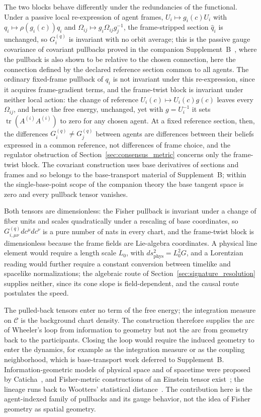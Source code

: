 \documentclass[11pt]{article}
\begin{document}
The two blocks behave differently under the redundancies of the functional. Under a passive local re-expression of agent frames, $U_i \mapsto g_i(c)U_i$ with $q_i \mapsto \rho(g_i(c))q_i$ and $\Omega_{ij} \mapsto g_i\Omega_{ij}g_j^{-1}$, the frame-stripped section $\hat{q}_i$ is unchanged, so $G^{(q)}_i$ is invariant with no orbit average; this is the passive gauge covariance of covariant pullbacks proved in the companion Supplement~B~\cite[Ch.~B2]{DennisGaugeVFESuppB2026}, where the pullback is also shown to be relative to the chosen connection, here the connection defined by the declared reference section common to all agents. The ordinary fixed-frame pullback of $q_i$ is not invariant under this re-expression, since it acquires frame-gradient terms, and the frame-twist block is invariant under neither local action: the change of reference $U_i(c) \mapsto U_i(c)g(c)$ leaves every $\Omega_{ij}$, and hence the free energy, unchanged, yet with $g = U_i^{-1}$ it sets $\operatorname{tr}(A^{(i)}A^{(i)})$ to zero for any chosen agent. At a fixed reference section, then, the differences $G^{(q)}_i \neq G^{(q)}_j$ between agents are differences between their beliefs expressed in a common reference, not differences of frame choice, and the regulator obstruction of Section~\ref{sec:consensus_metric} concerns only the frame-twist block. The covariant construction uses base derivatives of sections and frames and so belongs to the base-transport material of Supplement~B; within the single-base-point scope of the companion theory the base tangent space is zero and every pullback tensor vanishes.

Both tensors are dimensionless: the Fisher pullback is invariant under a change of fiber units and scales quadratically under a rescaling of base coordinates, so $G^{(q)}_{i,\mu\nu}dc^\mu dc^\nu$ is a pure number of nats in every chart, and the frame-twist block is dimensionless because the frame fields are Lie-algebra coordinates. A physical line element would require a length scale $L_0$, with $ds^2_{\text{phys}} = L_0^2 G$, and a Lorentzian reading would further require a constant conversion between timelike and spacelike normalizations; the algebraic route of Section~\ref{sec:signature_resolution} supplies neither, since its cone slope is field-dependent, and the causal route postulates the speed.

The pulled-back tensors enter no term of the free energy; the integration measure on $\mathcal{C}$ is the background chart density. The construction therefore supplies the arc of Wheeler's loop from information to geometry but not the arc from geometry back to the participants. Closing the loop would require the induced geometry to enter the dynamics, for example as the integration measure or as the coupling neighborhood, which is base-transport work deferred to Supplement~B. Information-geometric models of physical space and of spacetime were proposed by Caticha~\cite{Caticha2005, Caticha2019spacetime}, and Fisher-metric constructions of an Einstein tensor exist~\cite{Matsueda2013}; the lineage runs back to Wootters' statistical distance~\cite{Wootters1981}. The contribution here is the agent-indexed family of pullbacks and its gauge behavior, not the idea of Fisher geometry as spatial geometry.
\end{document}
